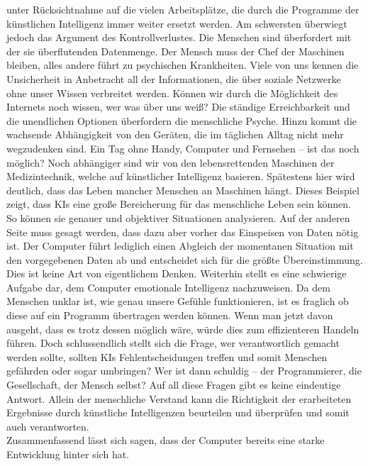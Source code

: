 unter Rücksichtnahme auf die vielen Arbeitsplätze, die durch die Programme der künstlichen Intelligenz immer weiter ersetzt werden. Am schwersten überwiegt jedoch das Argument des Kontrollverlustes. Die Menschen sind überfordert mit der sie überflutenden Datenmenge. Der Mensch muss der Chef der Maschinen bleiben, alles andere führt zu psychischen Krankheiten. Viele von uns kennen die Unsicherheit in Anbetracht all der Informationen, die über soziale Netzwerke ohne unser Wissen verbreitet werden. Können wir durch die Möglichkeit des Internets noch wissen, wer was über uns weiß? Die ständige Erreichbarkeit und die unendlichen Optionen überfordern die menschliche Psyche. Hinzu kommt die wachsende Abhängigkeit von den Geräten, die im täglichen Alltag nicht mehr wegzudenken sind. Ein Tag ohne Handy, Computer und Fernsehen – ist das noch möglich? Noch abhängiger sind wir von den lebensrettenden Maschinen der Medizintechnik, welche auf künstlicher Intelligenz basieren. Spätestens hier wird deutlich, dass das Leben mancher Menschen an Maschinen hängt. Dieses Beispiel zeigt, dass KIs eine große Bereicherung für das menschliche Leben sein können. So können sie genauer und objektiver Situationen analysieren. Auf der anderen Seite muss gesagt werden, dass dazu aber vorher das Einspeisen von Daten nötig ist. Der Computer führt lediglich einen Abgleich der momentanen Situation mit den vorgegebenen Daten ab und entscheidet sich für die größte Übereinstimmung. Dies ist keine Art von eigentlichem Denken. Weiterhin stellt es eine schwierige Aufgabe dar, dem Computer emotionale Intelligenz nachzuweisen. Da dem Menschen unklar ist, wie genau unsere Gefühle funktionieren, ist es fraglich ob diese auf ein Programm übertragen werden können. Wenn man jetzt davon ausgeht, dass es trotz dessen möglich wäre, würde dies zum effizienteren Handeln führen. Doch schlussendlich stellt sich die Frage, wer verantwortlich gemacht werden sollte, sollten KIs Fehlentscheidungen treffen und somit Menschen gefährden oder sogar umbringen? Wer ist dann schuldig – der Programmierer, die Gesellschaft, der Mensch selbst? Auf all diese Fragen gibt es keine eindeutige Antwort. Allein der menschliche Verstand kann die Richtigkeit der erarbeiteten Ergebnisse durch künstliche Intelligenzen beurteilen und überprüfen und somit auch verantworten.\\
Zusammenfassend lässt sich sagen, dass der Computer bereits eine starke Entwicklung hinter sich hat. 
